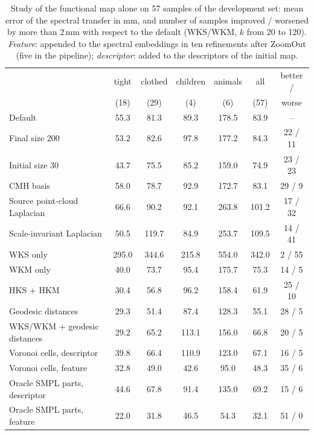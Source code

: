 \documentclass[11pt]{article}
\begin{document}
\begin{table}[t]
  \centering
  \caption{Study of the functional map alone on 57 samples of the development
  set: mean error of the spectral transfer in mm, and number of samples improved
  / worsened by more than 2\,mm with respect to the default (WKS/WKM, $k$ from
  20 to 120). \emph{Feature}: appended to the spectral embeddings in ten
  refinements after ZoomOut (five in the pipeline); \emph{descriptor}: added
  to the descriptors of the initial map.}
  \label{tab:mapstudy}
  \small
  \setlength{\tabcolsep}{4pt}
  \begin{tabular}{lcccccc}
    \toprule
    & tight & clothed & children & animals & all & better / \\
    & (18) & (29) & (4) & (6) & (57) & worse \\
    \midrule
    Default                               &  55.3 &  81.3 &  89.3 & 178.5 &  83.9 & -- \\
    Final size 200                        &  53.2 &  82.6 &  97.8 & 177.2 &  84.3 & 22 / 11 \\
    Initial size 30                       &  43.7 &  75.5 &  85.2 & 159.0 &  74.9 & 23 / 23 \\
    CMH basis                             &  58.0 &  78.7 &  92.9 & 172.7 &  83.1 & 29 / 9 \\
    Source point-cloud Laplacian          &  66.6 &  90.2 &  92.1 & 263.8 & 101.2 & 17 / 32 \\
    Scale-invariant Laplacian             &  50.5 & 119.7 &  84.9 & 253.7 & 109.5 & 14 / 41 \\
    \midrule
    WKS only                              & 295.0 & 344.6 & 215.8 & 554.0 & 342.0 & 2 / 55 \\
    WKM only                              &  40.0 &  73.7 &  95.4 & 175.7 &  75.3 & 14 / 5 \\
    HKS + HKM                             &  30.4 &  56.8 &  96.2 & 158.4 &  61.9 & 25 / 10 \\
    Geodesic distances                    &  29.3 &  51.4 &  87.4 & 128.3 &  55.1 & 28 / 5 \\
    WKS/WKM + geodesic distances          &  29.2 &  65.2 & 113.1 & 156.0 &  66.8 & 20 / 5 \\
    \midrule
    Voronoi cells, descriptor             &  39.8 &  66.4 & 110.9 & 123.0 &  67.1 & 16 / 5 \\
    Voronoi cells, feature                &  32.8 &  49.0 &  42.6 &  95.0 &  48.3 & 35 / 6 \\
    Oracle SMPL parts, descriptor         &  44.6 &  67.8 &  91.4 & 135.0 &  69.2 & 15 / 6 \\
    Oracle SMPL parts, feature            &  22.0 &  31.8 &  46.5 &  54.3 &  32.1 & 51 / 0 \\
    \bottomrule
  \end{tabular}
\end{table}
\end{document}
